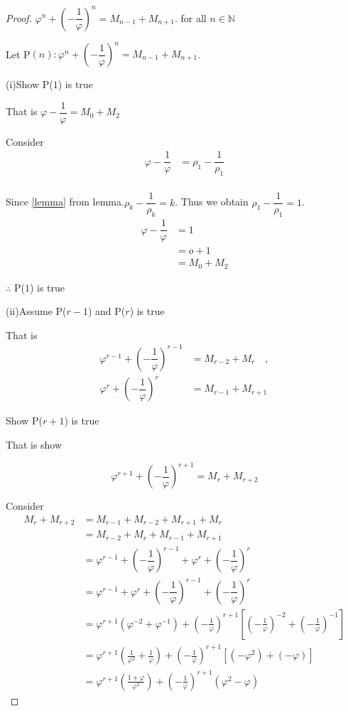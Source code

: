 \documentclass{rmutt-seminar}
\begin{document}
\begin{proof}
$\varphi^n + \left(-\dfrac{1}{\varphi}\right)^n = M_{n-1} + M_{n+1} $. for all $n \in \mathbb{N}$

\quad Let P$(n):\varphi^n + \left(-\dfrac{1}{\varphi}\right)^n = M_{n-1} + M_{n+1}$. 

\quad (i)\quad Show P($1$) is true 

\quad \quad \quad That is $\varphi - \dfrac{1}{\varphi} = M_{0} + M_{2}$ 

\quad \quad \quad Consider
\begin{align*}
 	\varphi - \dfrac{1}{\varphi} &= \rho_1 - \dfrac{1}{\rho_1}\\
 \end{align*}
 
\quad \quad \quad Since \eqref{lemma} from lemma.\quad $\rho_k-\dfrac{1}{\rho_k}=k$. Thus we obtain $\rho_1-\dfrac{1}{\rho_1}=1$.
 \begin{align*}
 	\varphi - \dfrac{1}{\varphi} &= 1\\
 	&= o + 1\\
 	&= M_{0} + M_{2}
 \end{align*}
 
\quad \quad \quad $\therefore$ P($1$) is true
 
\quad (ii)\quad Assume P($r-1$) and P($r$) is true

\quad \quad \quad That is 
\begin{align*}
	\varphi^{r-1} + \left(-\dfrac{1}{\varphi}\right)^{r-1} &= M_{r-2} + M_{r} \quad, \\
	\varphi^{r} + \left(-\dfrac{1}{\varphi}\right)^{r} &= M_{r-1} + M_{r+1}
\end{align*}

\quad \quad \quad Show P($r+1$) is true
 
\quad \quad \quad That is show 
 
$$ \varphi^{r+1} + \left(-\dfrac{1}{\varphi}\right)^{r+1}= M_{r} + M_{r+2} $$

\quad \quad \quad Consider
\begin{align*}
	M_{r} + M_{r+2} &= M_{r-1} + M_{r-2} + M_{r+1} + M_r \\
	&= M_{r-2} + M_r + M_{r-1} + M_{r+1} \\
	&= \varphi^{r-1} + \left(-\dfrac{1}{\varphi}\right)^{r-1} +\varphi^{r} + \left(-\dfrac{1}{\varphi}\right)^{r} \\
	&= \varphi^{r-1} + \varphi^{r} + \left(-\dfrac{1}{\varphi}\right)^{r-1} + \left(-\dfrac{1}{\varphi}\right)^{r} \\
	&= \varphi^{r+1}(\varphi^{-2} + \varphi^{-1}) + \left(-\frac{1}{\varphi}\right)^{r+1} \left[ \left(-\frac{1}{\varphi}\right)^{-2} + \left(-\frac{1}{\varphi}\right)^{-1}\right] \\
	&= \varphi^{r+1} \left(\frac{1}{\varphi^2} + \frac{1}{\varphi}\right) + \left(-\frac{1}{\varphi}\right)^{r+1}[(-\varphi^2)+(-\varphi)] \\
	&= \varphi^{r+1}\left(\frac{1+\varphi}{\varphi^2}\right)+\left(-\frac{1}{\varphi}\right)^{r+1}(\varphi^2-\varphi)
\end{align*}


\end{proof}
\end{document}
